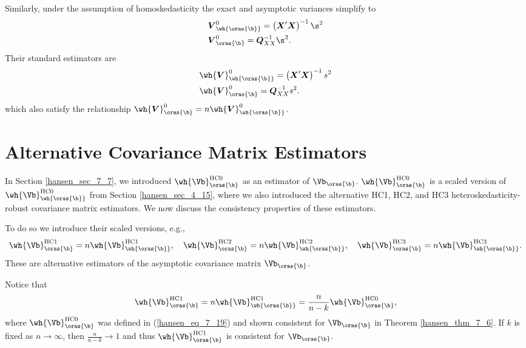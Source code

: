 Similarly, under the assumption of homoskedasticity the exact and asymptotic variances simplify to
\begin{equation}
    \notag
    \begin{aligned}
        & \boldsymbol{V}_{\wh{\oras{\b}}}^0 = \left(\boldsymbol{X}^{\prime} \boldsymbol{X}\right)^{-1} \s^2 \\
        & \boldsymbol{V}_{\oras{\b}}^0 = \boldsymbol{Q}_{X X}^{-1} \s^2.
    \end{aligned}
\end{equation}
Their standard estimators are 
\begin{equation}
    \notag
    \begin{aligned}
        & \wh{\boldsymbol{V}}_{\wh{\oras{\b}}}^0 = \left(\boldsymbol{X}^{\prime} \boldsymbol{X}\right)^{-1} s^2 \\
        & \wh{\boldsymbol{V}}_{\oras{\b}}^0 = \boldsymbol{Q}_{X X}^{-1} s^2.
    \end{aligned}
\end{equation}
which also satisfy the relationship $\wh{\boldsymbol{V}}_{\oras{\b}}^0 = n \wh{\boldsymbol{V}}_{\wh{\oras{\b}}}^0$.

\section{Alternative Covariance Matrix Estimators}

In Section \ref{hansen_sec_7_7}, we introduced $\wh{\Vb}_{\oras{\b}}^{\text{HC0}}$ as an estimator of $\Vb_{\oras{\b}}$. $\wh{\Vb}_{\oras{\b}}^{\text{HC0}}$ is a scaled version of $\wh{\Vb}_{\wh{\oras{\b}}}^{\text{HC0}}$ from Section \ref{hansen_sec_4_15}, where we also introduced the alternative HC1, HC2, and HC3 heteroskedasticity-robust covariance matrix estimators. We now discuss the consistency properties of these estimators. 

To do so we introduce their scaled versions, e.g., 
\begin{equation}
    \notag 
    \wh{\Vb}_{\oras{\b}}^{\text{HC1}} = n \wh{\Vb}_{\wh{\oras{\b}}}^{\text{HC1}}, \quad \wh{\Vb}_{\oras{\b}}^{\text{HC2}} = n \wh{\Vb}_{\wh{\oras{\b}}}^{\text{HC2}},\quad \wh{\Vb}_{\oras{\b}}^{\text{HC3}} = n \wh{\Vb}_{\wh{\oras{\b}}}^{\text{HC3}}.
\end{equation}
These are alternative estimators of the asymptotic covariance matrix $\Vb_{\oras{\b}}$.

Notice that 
\begin{equation}
    \notag 
    \wh{\Vb}_{\oras{\b}}^{\text{HC1}} = n \wh{\Vb}_{\wh{\oras{\b}}}^{\text{HC1}} = \frac{n}{n-k} \wh{\Vb}_{{\oras{\b}}}^{\text{HC0}},
\end{equation}
where $\wh{\Vb}_{{\oras{\b}}}^{\text{HC0}}$ was defined in (\ref{hansen_eq_7_19}) and shown consistent for $\Vb_{\oras{\b}}$ in Theorem \ref{hansen_thm_7_6}. If $k$ is fixed as $n \rightarrow \infty$, then $\frac{n}{n-k} \rightarrow 1$ and thus $\wh{\Vb}_{\oras{\b}}^{\text{HC1}}$ is consistent for $\Vb_{\oras{\b}}$.

